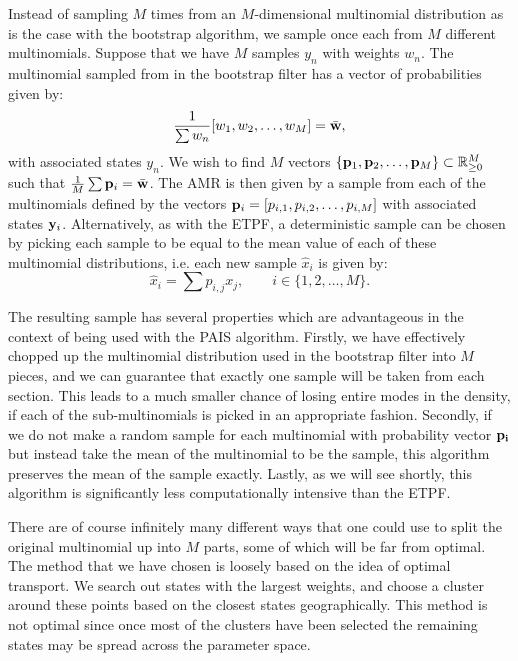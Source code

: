 \documentclass[final]{siamltex}
\begin{document}
Instead of sampling $M$ times from an $M$-dimensional multinomial
distribution as is the case with the bootstrap algorithm, we sample
once each from $M$ different multinomials. Suppose that we have $M$
samples $y_n$ with weights $w_n$. The multinomial sampled from in the
bootstrap filter has a vector of probabilities given by:
\begin{equation*}
\frac{1}{\sum w_n} [w_1,w_2,\ldots,w_M] = \bar{\bf w},
\end{equation*}
with associated states $y_n$.
We wish to find $M$ vectors $\{{\bf p}_1,{\bf p}_2,\ldots,{\bf p}_M\}
\subset \mathbb{R}^M_{\ge 0}$
such that  $\frac{1}{M} \sum {\bf p}_i = \bar{\bf w}$. The AMR is then
given by a sample from each of the multinomials defined by the vectors
${\bf p}_i = [p_{i,1},p_{i,2},\ldots,p_{i,M}]$ with associated states ${\bf y}_i$. Alternatively, as with the ETPF, a deterministic sample
can be chosen by picking each sample to be equal to the mean value of
each of these multinomial distributions, i.e. each new sample
$\hat{x}_i$ is given by:
\begin{equation}
\hat{x}_i = \sum p_{i,j} x_j, \qquad i \in \{1,2,\ldots,M\}.
\end{equation}

The resulting sample has several properties which are advantageous in
the context of being used with the PAIS algorithm. Firstly, we have
effectively chopped up the multinomial distribution used in the
bootstrap filter into $M$ pieces, and we can guarantee that exactly
one sample will be taken from each section. This leads to a much
smaller chance of losing entire modes in the density, if each of the
sub-multinomials is picked in an appropriate fashion. Secondly, if we do not make a random sample for
each multinomial with probability vector $\bf p_i$ but instead take
the mean of the multinomial to be the sample, this algorithm preserves
the mean of the sample exactly. Lastly, as we will see shortly, this
algorithm is significantly less computationally intensive than the
ETPF.

There are of course infinitely many different ways that one could use
to split the original multinomial up into $M$ parts, some of which
will be far from optimal. The method that we have chosen is loosely
based on the idea of optimal transport. We search out states with the
largest weights, and choose a cluster around these points based on
the closest states geographically. This method is not optimal since
once most of the clusters have been selected the remaining states
may be spread across the parameter space.
\end{document}
